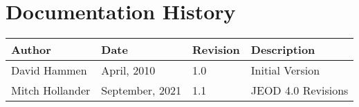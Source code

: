 
\section{Documentation History}
\begin{tabular}{||l|l|l|l|} \hline
{\bf Author } & {\bf Date} & {\bf Revision} & {\bf Description} \\ \hline \hline
 David Hammen & April, 2010 & 1.0 & Initial Version \\ \hline
 Mitch Hollander & September, 2021 & 1.1 & JEOD 4.0 Revisions \\ \hline
\end{tabular}
